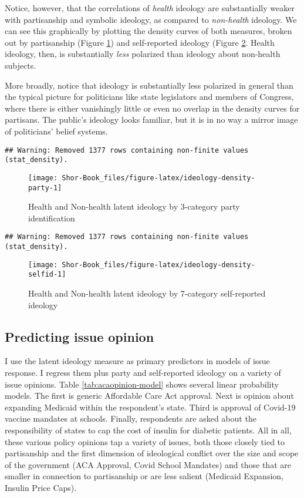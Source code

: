 \documentclass[
  oneside]{book}
\begin{document}
Notice, however, that the correlations of \emph{health} ideology are substantially weaker with partisanship and symbolic ideology, as compared to \emph{non-health} ideology. We can see this graphically by plotting the density curves of both measures, broken out by partisanship (Figure \ref{fig:ideology-density-party}) and self-reported ideology (Figure \ref{fig:ideology-density-selfid}. Health ideology, then, is substantially \emph{less} polarized than ideology about non-health subjects.

More broadly, notice that ideology is substantially less polarized in general than the typical picture for politicians like state legislators and members of Congress, where there is either vanishingly little or even no overlap in the density curves for partisans. The public's ideology looks familiar, but it is in no way a mirror image of politicians' belief systems.

\begin{verbatim}
## Warning: Removed 1377 rows containing non-finite values (stat_density).
\end{verbatim}

\begin{figure}
\texttt{[image: Shor-Book\_files/figure-latex/ideology-density-party-1]} \caption{Health and Non-health latent ideology by 3-category party identification}\label{fig:ideology-density-party}
\end{figure}

\begin{verbatim}
## Warning: Removed 1377 rows containing non-finite values (stat_density).
\end{verbatim}

\begin{figure}
\texttt{[image: Shor-Book\_files/figure-latex/ideology-density-selfid-1]} \caption{Health and Non-health latent ideology by 7-category self-reported ideology}\label{fig:ideology-density-selfid}
\end{figure}

\hypertarget{predicting-issue-opinion}{%
\subsection{Predicting issue opinion}\label{predicting-issue-opinion}}

I use the latent ideology measure as primary predictors in models of issue response. I regress them plus party and self-reported ideology on a variety of issue opinions. Table \ref{tab:acaopinion-model} shows several linear probability models. The first is generic Affordable Care Act approval. Next is opinion about expanding Medicaid within the respondent's state. Third is approval of Covid-19 vaccine mandates at schools. Finally, respondents are asked about the responsibility of states to cap the cost of insulin for diabetic patients. All in all, these various policy opinions tap a variety of issues, both those closely tied to partisanship and the first dimension of ideological conflict over the size and scope of the government (ACA Approval, Covid School Mandates) and those that are smaller in connection to partisanship or are less salient (Medicaid Expansion, Insulin Price Caps).
\end{document}
